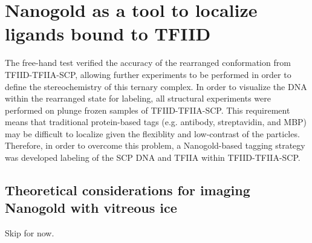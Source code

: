 \section{Nanogold as a tool to localize ligands bound to TFIID}

The free-hand test verified the accuracy of the rearranged conformation from TFIID-TFIIA-SCP, allowing further experiments to be performed in order to define the stereochemistry of this ternary complex. In order to visualize the DNA within the rearranged state for labeling, all structural experiments were performed on plunge frozen samples of TFIID-TFIIA-SCP. This requirement means that traditional protein-based tags (e.g. antibody, streptavidin, and MBP) may be difficult to localize given the flexiblity and low-contrast of the particles. Therefore, in order to overcome this problem, a Nanogold-based tagging strategy was developed labeling of the SCP DNA and TFIIA within TFIID-TFIIA-SCP.
 
\subsection{Theoretical considerations for imaging Nanogold with vitreous ice}

Skip for now.

